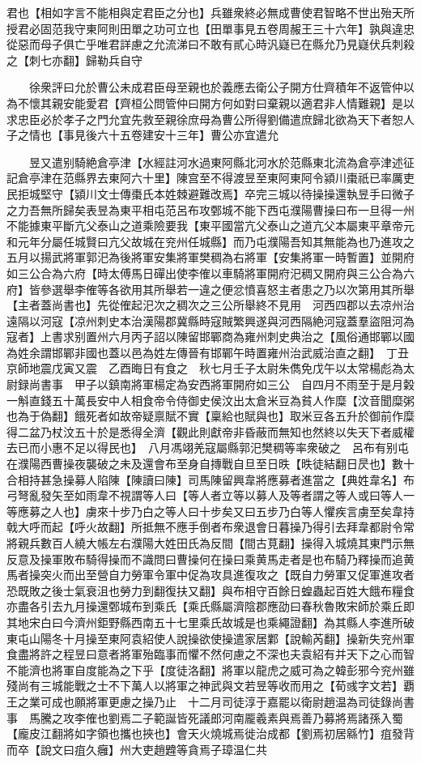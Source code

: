 君也【相如字言不能相與定君臣之分也】兵雖衆終必無成曹使君智略不世出殆天所授君必固范我守東阿則田單之功可立也【田單事見五卷周赧王三十六年】孰與違忠從惡而母子俱亡乎唯君詳慮之允流涕曰不敢有貳心時汎嶷已在縣允乃見嶷伏兵刺殺之【刺七亦翻】歸勒兵自守

　　徐衆評曰允於曹公未成君臣母至親也於義應去衛公子開方仕齊積年不返管仲以為不懷其親安能愛君【齊桓公問管仲曰開方何如對曰棄親以適君非人情難親】是以求忠臣必於孝子之門允宜先救至親徐庶母為曹公所得劉備遣庶歸北欲為天下者恕人子之情也【事見後六十五卷建安十三年】曹公亦宜遣允

　　昱又遣别騎絶倉亭津【水經註河水過東阿縣北河水於范縣東北流為倉亭津述征記倉亭津在范縣界去東阿六十里】陳宫至不得渡昱至東阿東阿令潁川棗祇已率厲吏民拒城堅守【潁川文士傳棗氏本姓棘避難改焉】卒完三城以待操操還執昱手曰微子之力吾無所歸矣表昱為東平相屯范呂布攻鄄城不能下西屯濮陽曹操曰布一旦得一州不能據東平斷亢父泰山之道乘險要我【東平國當亢父泰山之道亢父本屬東平章帝元和元年分屬任城賢曰亢父故城在兖州任城縣】而乃屯濮陽吾知其無能為也乃進攻之　五月以揚武將軍郭汜為後將軍安集將軍樊稠為右將軍【安集將軍一時暫置】並開府如三公合為六府【時太傅馬日磾出使李傕以車騎將軍開府汜稠又開府與三公合為六府】皆參選舉李傕等各欲用其所舉若一違之便忿憤喜怒主者患之乃以次第用其所舉【主者蓋尚書也】先從傕起汜次之稠次之三公所舉終不見用　河西四郡以去凉州治遠隔以河寇【凉州刺史本治漢陽郡冀縣時寇賊繁興遂與河西隔絶河寇蓋羣盜阻河為寇者】上書求别置州六月丙子詔以陳留邯鄲商為雍州刺史典治之【風俗通邯鄲以國為姓余謂邯鄲非國也蓋以邑為姓左傳晉有邯鄲午時置雍州治武威治直之翻】　丁丑京師地震戊寅又震　乙酉晦日有食之　秋七月壬子太尉朱儁免戊午以太常楊彪為太尉録尚書事　甲子以鎮南將軍楊定為安西將軍開府如三公　自四月不雨至于是月糓一斛直錢五十萬長安中人相食帝令侍御史侯汶出太倉米豆為貧人作糜【汶音聞糜粥也為于偽翻】餓死者如故帝疑禀賦不實【稟給也賦與也】取米豆各五升於御前作糜得二盆乃杖汶五十於是悉得全濟【觀此則獻帝非昏蔽而無知也然終以失天下者威權去已而小惠不足以得民也】　八月馮翊羌寇屬縣郭汜樊稠等率衆破之　呂布有别屯在濮陽西曹操夜襲破之未及還會布至身自摶戰自旦至日昳【昳徒結翻日昃也】數十合相持甚急操募人陷陳【陳讀曰陳】司馬陳留興韋將應募者進當之【典姓韋名】布弓弩亂發矢至如雨韋不視謂等人曰【等人者立等以募人及等者謂之等人或曰等人一等應募之人也】虜來十步乃白之等人曰十步矣又曰五步乃白等人懼疾言虜至矣韋持戟大呼而起【呼火故翻】所抵無不應手倒者布衆退會日暮操乃得引去拜韋都尉令常將親兵數百人繞大帳左右濮陽大姓田氏為反間【間古莧翻】操得入城燒其東門示無反意及操軍敗布騎得操而不識問曰曹操何在操曰乘黄馬走者是也布騎乃釋操而追黄馬者操突火而出至營自力勞軍令軍中促為攻具進復攻之【既自力勞軍又促軍進攻者恐既敗之後士氣衰沮也勞力到翻復扶又翻】與布相守百餘日蝗蟲起百姓大餓布糧食亦盡各引去九月操還鄄城布到乘氏【乘氏縣屬濟陰郡應劭曰春秋魯敗宋師於乘丘即其地宋白曰今濟州鉅野縣西南五十七里乘氏故城是也乘繩證翻】為其縣人李進所破東屯山陽冬十月操至東阿袁紹使人說操欲使操遣家居鄴【說輸芮翻】操新失兖州軍食盡將許之程昱曰意者將軍殆臨事而懼不然何慮之不深也夫袁紹有并天下之心而智不能濟也將軍自度能為之下乎【度徒洛翻】將軍以龍虎之威可為之韓彭邪今兖州雖殘尚有三城能戰之士不下萬人以將軍之神武與文若昱等收而用之【荀彧字文若】覇王之業可成也願將軍更慮之操乃止　十二月司徒淳于嘉罷以衛尉趙温為司徒錄尚書事　馬騰之攻李傕也劉焉二子範誕皆死議郎河南龎羲素與焉善乃募將焉諸孫入蜀【龐皮江翻將如字領也攜也挾也】會天火燒城焉徙治成都【劉焉初居緜竹】疽發背而卒【說文曰疽久癰】州大吏趙韙等貪焉子璋温仁共
